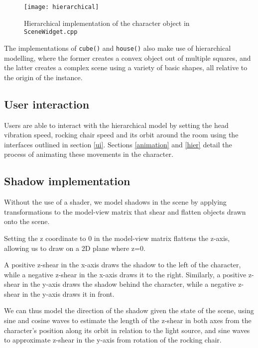 \documentclass{article}
\begin{document}
		\noindent
		\begin{minipage}{\textwidth}
			\begin{figure}[H]
				\centering	
				\texttt{[image: hierarchical]}
				\caption{Hierarchical implementation of the character object in \texttt{SceneWidget.cpp}}
				\label{hierarchical}
			\end{figure}
		\end{minipage}
		
		\bigskip
		The implementations of \texttt{cube()} and \texttt{house()} also make use of hierarchical modelling,
		where the former creates a convex object out of multiple squares, and the latter creates a complex scene
		using a variety of basic shapes, all relative to the origin of the instance.
		
		\subsection{User interaction}
		Users are able to interact with the hierarchical model by setting the head vibration speed, rocking chair speed and
		its orbit around the room using the interfaces outlined in section \ref{ui}. Sections \ref{animation} 
		and \ref{hier} detail the process of animating these movements in the character.

		\subsection{Shadow implementation}
		Without the use of a shader, we model shadows in the scene by applying transformations to the model-view
		matrix that shear and flatten objects drawn onto the scene.
		
		\bigskip
		
		Setting the z coordinate to 0 in the model-view matrix flattens the z-axis, allowing us
		to draw on a 2D plane where z=0.

		\bigskip

		A positive z-shear in the x-axis draws the shadow to the left of the character, while a negative z-shear
		in the x-axis draws it to the right. Similarly, a positive z-shear in the y-axis draws the shadow
		behind the character, while a negative z-shear in the y-axis draws it in front.
		
		\bigskip
		
		We can thus model the direction of the shadow given the state of the scene, using sine
		and cosine  waves to estimate the length of the z-shear in both axes from the character's
		position along its orbit in relation to the light source, and sine waves to approximate z-shear in the
		y-axis from rotation of the rocking chair.
\end{document}
